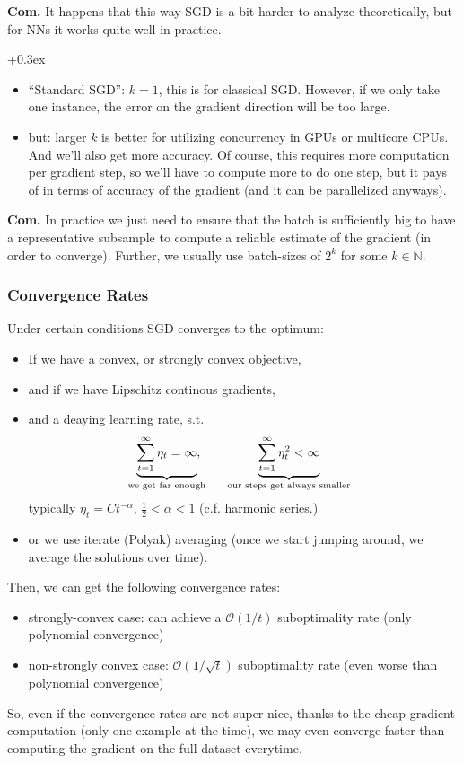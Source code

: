 \documentclass[a2paper,8pt]{extarticle}
\newcommand{\BigO}{\mathcal{O}}
\newcommand{\N}{\mathbb{N}}
\newcommand{\customboxpaddingsize}{0pt}
\newcommand{\emptyarg}[1][]{\ifthenelse{\isempty{#1}}{}{\ (#1)}}
\newcommand{\Def}[1][]{{\setlength\fboxsep{\customboxpaddingsize}
\colorbox{defcolor}{%
\color{custtitlecolor}{\textbf{D.\emptyarg[#1]}}}\kern+0.3ex}}
\newcommand{\Com}{\textbf{Com.} }
\newcommand{\ssep}{\hdashrule[1.1ex]{\linewidth}{0.1pt}{0.3mm}\vspace{-6pt}}
\newcommand{\ssep}{\hdashrule[1.1ex]{\linewidth}{0.1pt}{0.3mm}\vspace{-3pt}}
\begin{document}
\begin{landscape}
\begin{multicols*}{7}
\Com It happens that this way SGD is a bit harder to analyze theoretically, but
for NNs it works quite well in practice.

\ssep

\Def[Minibatch Size]
\begin{itemize}
  \item ``Standard SGD'': $k=1$, this is for classical SGD. 
  However, if we only take one instance, the error on the gradient 
  direction will be too large.
  \item but: larger $k$ is better for utilizing concurrency in GPUs or multicore
  CPUs. And we'll also get more accuracy. Of course, this requires more
  computation per gradient step, so we'll have to compute more to do one step,
  but it pays of in terms of accuracy of the gradient (and it can be
  parallelized anyways).
\end{itemize}

\Com In practice we just need to ensure that the batch is sufficiently big to
have a representative subsample to compute a reliable estimate of the gradient
(in order to converge). Further, we usually use batch-sizes of $2^k$ for some
$k\in\N$.

\subsubsection{Convergence Rates}

Under certain conditions SGD converges to the optimum:
\begin{itemize}
  \item If we have a convex, or strongly convex objective,
  \item and if we have Lipschitz continous gradients,
  \item and a deaying learning rate, s.t.
  \[
  \underbrace{\sum_{t=1}^\infty\eta_t=\infty}_{\mathclap{\text{we get far
  enough}}},
  \qquad
  \underbrace{\sum_{t=1}^\infty\eta_t^2<\infty}_{\text{our steps get always
  smaller}}
  \]
  typically $\eta_t=Ct^{-\alpha}$, $\frac{1}{2}<\alpha<1$ (c.f. harmonic
  series.)
  \item or we use iterate (Polyak) averaging (once we start jumping around, we
  average the solutions over time).
\end{itemize}
Then, we can get the following convergence rates:
\begin{itemize}
  \item strongly-convex case: can achieve a $\BigO(1/t)$ suboptimality rate
  (only polynomial convergence)
  \item non-strongly convex case: $\BigO(1/\sqrt{t})$ suboptimality rate (even
  worse than polynomial convergence)
\end{itemize}
So, even if the convergence rates are not super nice, thanks to the cheap
gradient computation (only one example at the time), we may even converge faster
than computing the gradient on the full dataset everytime.


\end{multicols*}
\end{landscape}
\end{document}
